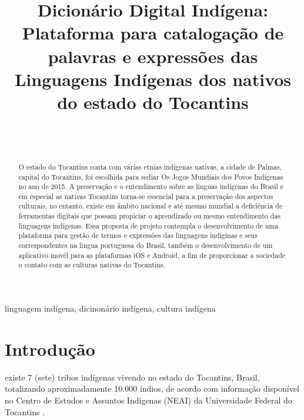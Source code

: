 \documentclass[journal]{IEEEtran}
\begin{document}
\title{Dicionário Digital Indígena: Plataforma para catalogação de palavras e expressões das Linguagens Indígenas dos nativos do estado do Tocantins}
\author{
	\\
	\\
}


\maketitle

\begin{abstract}

O estado do Tocantins conta com várias etnias indígenas nativas, a cidade de Palmas, capital do Tocantins, foi escolhida para sediar Os Jogos Mundiais dos Povos Indígenas no ano de 2015. A preservação e o entendimento sobre as línguas indígenas do Brasil e em especial as nativas Tocantins torna-se essencial para a preservação dos aspectos culturais, no entanto, existe em âmbito nacional e até mesmo mundial a deficiência de ferramentas digitais que possam propiciar o aprendizado ou mesmo entendimento das linguagens indígenas. Essa proposta de projeto contempla o desenvolvimento de uma plataforma para gestão de termos e expressões das linguagens indíginas e seus correspondentes na lingua portuguesa do Brasil, também o desenvolvimento de um aplicativo movél para as plataformas iOS e Android, a fim de proporcionar a sociedade o contato com as culturas nativas do Tocantins.

\end{abstract}

\begin{IEEEkeywords}
linguagem indígena, dicinonário indígena, cultura indígena
\end{IEEEkeywords}

\section{Introdução}

 existe 7 (sete) tribos indígenas vivendo no estado do Tocantins, Brasil, totalizando aproximadamente 10.000 índios, de acordo com informação disponível no Centro de Estudos e Assuntos Indígenas (NEAI) da Universidade Federal do Tocantins \cite{demobile}.
\end{document}
